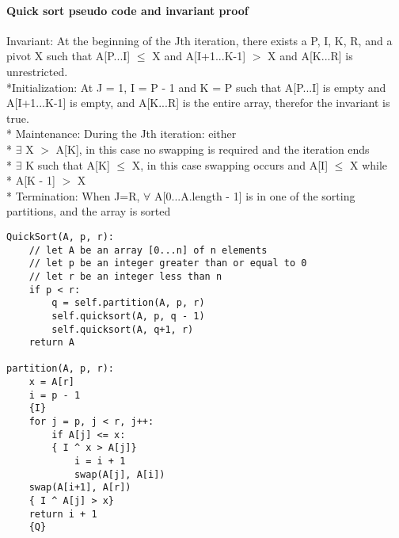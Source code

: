 \documentclass[10pt,letterpaper]{report}
\begin{document}
\paragraph{Quick sort pseudo code and invariant proof}
	Invariant: At the beginning of the Jth iteration, there exists a P, I, K, R, and a pivot X such that A[P...I] $ \leq $ X and A[I+1...K-1] $ > $ X and A[K...R] is unrestricted. 
	\\*Initialization: At J = 1, I = P - 1 and K = P such that A[P...I] is empty and A[I+1...K-1] is empty, and A[K...R] is the entire array, therefor the invariant is true. 
	\\* Maintenance: During the Jth iteration: either
	\\* $ \exists $ X $ > $ A[K], in this case no swapping is required and the iteration ends
	\\* $ \exists $ K such that A[K] $ \leq $ X, in this case swapping occurs and A[I] $ \leq $ X while \\* A[K - 1] $ > $ X 
	\\* Termination: When J=R, $\forall $ A[0...A.length - 1] is in one of the sorting partitions, and the array is sorted
	\begin{lstlisting}
QuickSort(A, p, r):
	// let A be an array [0...n] of n elements
	// let p be an integer greater than or equal to 0
	// let r be an integer less than n
	if p < r:
		q = self.partition(A, p, r)
		self.quicksort(A, p, q - 1)
		self.quicksort(A, q+1, r)
	return A
	
partition(A, p, r):		
	x = A[r]
	i = p - 1
	{I}
	for j = p, j < r, j++:
		if A[j] <= x:
		{ I ^ x > A[j]}
			i = i + 1
			swap(A[j], A[i])
	swap(A[i+1], A[r])
	{ I ^ A[j] > x}
	return i + 1
	{Q}
	\end{lstlisting}
	
\end{document}
